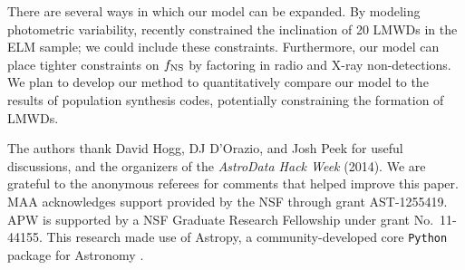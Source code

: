 \documentclass[apjl]{emulateapj}
\begin{document}
There are several ways in which our model can be expanded. By modeling photometric variability, \citet{hermes14} recently constrained the inclination of 20 LMWDs in the ELM sample; we could include these constraints. Furthermore, our model can place tighter constraints on $f_{\rm NS}$ by factoring in radio and X-ray non-detections. We plan to develop our method to quantitatively compare our model to the results of population synthesis codes, potentially constraining the formation of LMWDs.

\acknowledgements
The authors thank David Hogg, DJ D'Orazio, and Josh Peek for useful discussions, and the organizers of the \emph{AstroData Hack Week} (2014). We are grateful to the anonymous referees for comments that helped improve this paper. MAA acknowledges support provided by the NSF through grant AST-1255419. APW is supported by a NSF Graduate Research Fellowship under grant No.\ 11-44155. This research made use of Astropy, a community-developed core \texttt{Python} package for Astronomy \citep{astropy13}. \\


\end{document}
